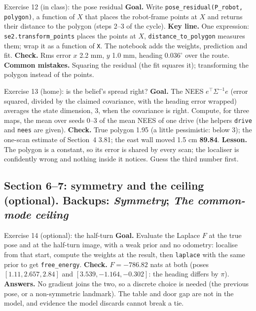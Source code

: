 \documentclass[11pt]{article}
\begin{document}
\begin{labhelp}{Exercise 12 (in class): the pose residual}
\textbf{Goal.} Write \texttt{pose\_residual(P\_robot, polygon)}, a function of $X$ that places the robot-frame points at $X$ and returns their distance to the polygon (steps 2--3 of the cycle). \textbf{Key line.} One expression: \texttt{se2.transform\_points} places the points at $X$, \texttt{distance\_to\_polygon} measures them; wrap it as a function of \texttt{X}. The notebook adds the weights, prediction and fit. \textbf{Check.} Rms error $x$ 2.2 mm, $y$ 1.0 mm, heading $0.036^\circ$ over the route. \textbf{Common mistakes.} Squaring the residual (the fit squares it); transforming the polygon instead of the points.
\end{labhelp}

\begin{labhelp}{Exercise 13 (home): is the belief's spread right?}
\textbf{Goal.} The NEES $e^\top\Sigma^{-1}e$ (error squared, divided by the claimed covariance, with the heading error wrapped) averages the state dimension, 3, when the covariance is right. Compute, for three maps, the mean over seeds 0--3 of the mean NEES of one drive (the helpers \texttt{drive} and \texttt{nees} are given). \textbf{Check.} True polygon 1.95 (a little pessimistic: below 3); the one-scan estimate of Section~4 3.81; the east wall moved 1.5 cm \textbf{89.84}. \textbf{Lesson.} The polygon is a constant, so its error is shared by every scan; the localiser is confidently wrong and nothing inside it notices. Guess the third number first.
\end{labhelp}

\subsection*{Section 6--7: symmetry and the ceiling (optional). Backups: \emph{Symmetry}; \emph{The common-mode ceiling}}

\begin{labhelp}{Exercise 14 (optional): the half-turn}
\textbf{Goal.} Evaluate the Laplace $F$ at the true pose and at the half-turn image, with a weak prior and no odometry: localise from that start, compute the weights at the result, then \texttt{laplace} with the same prior to get \texttt{free\_energy}. \textbf{Check.} $F=-786.82$ nats at both (poses $[1.11,2.657,2.84]$ and $[3.539,-1.164,-0.302]$: the heading differs by $\pi$). \textbf{Answers.} No gradient joins the two, so a discrete choice is needed (the previous pose, or a non-symmetric landmark). The table and door gap are not in the model, and evidence the model discards cannot break a tie.
\end{labhelp}
\end{document}
